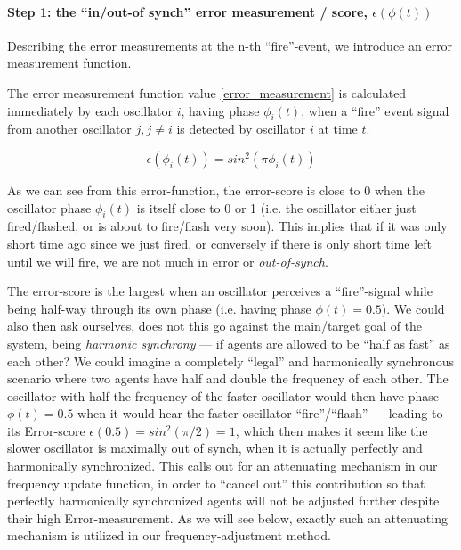 		\paragraph{Step 1: the ``in/out-of synch'' error measurement / score, $\epsilon(\phi(t))$}

		Describing the error measurements at the n-th ``fire''-event, we introduce an error measurement function.

		The error measurement function value \eqref{error_measurement} is calculated immediately by each oscillator $i$, having phase $\phi_i(t)$, when a ``fire'' event signal from another oscillator $j, j \neq i$ is detected by oscillator $i$ at time $t$.

		\begin{equation}
		\label{error_measurement}
			\epsilon(\phi_i(t)) = sin^2(\pi\phi_i(t))
		\end{equation} \nl
		

		As we can see from this error-function, the error-score is close to 0 when the oscillator phase $\phi_i(t)$ is itself close to 0 or 1 (i.e. the oscillator either just fired/flashed, or is about to fire/flash very soon). This implies that if it was only short time ago since we just fired, or conversely if there is only short time left until we will fire, we are not much in error or \textit{out-of-synch}. 

		The error-score is the largest when an oscillator perceives a ``fire''-signal while being half-way through its own phase (i.e. having phase $\phi(t)=0.5$). We could also then ask ourselves, does not this go against the main/target goal of the system, being \textit{harmonic synchrony} — if agents are allowed to be ``half as fast'' as each other? We could imagine a completely ``legal'' and harmonically synchronous scenario where two agents have half and double the frequency of each other. The oscillator with half the frequency of the faster oscillator would then have phase $\phi(t)=0.5$ when it would hear the faster oscillator ``fire''/``flash'' — leading to its Error-score $\epsilon(0.5) = sin^2(\pi/2) = 1$, which then makes it seem like the slower oscillator is maximally out of synch, when it is actually perfectly and harmonically synchronized. This calls out for an attenuating mechanism in our frequency update function, in order to ``cancel out'' this contribution so that perfectly harmonically synchronized agents will not be adjusted further despite their high Error-measurement. As we will see below, exactly such an attenuating mechanism is utilized in our frequency-adjustment method.

